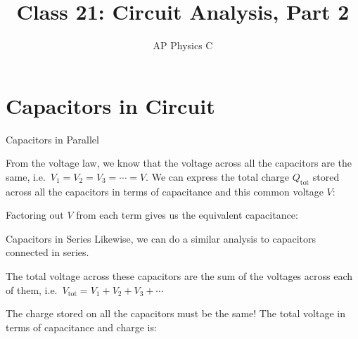 \documentclass[12pt,aspectratio=169]{beamer}
\title{Class 21: Circuit Analysis, Part 2}
\subtitle{AP Physics C}
\begin{document}
\begin{frame}
  \maketitle
\end{frame}



\section{Capacitors in Circuit}

\begin{frame}{Capacitors in Parallel}
  \begin{center}
  \end{center}
  From the voltage law, we know that the voltage across all the capacitors are
  the same, i.e.\ $V_1=V_2=V_3=\cdots=V$. We can express the total charge
  $Q_\text{tot}$ stored across all the capacitors in terms of capacitance and
  this common voltage $V$: 

  
  Factoring out $V$ from each term gives us the equivalent capacitance:

\end{frame}



\begin{frame}{Capacitors in Series}
  Likewise, we can do a similar analysis to capacitors connected in series.
  \begin{center}
  \end{center}
  The total voltage across these capacitors are the sum of the voltages across
  each of them, i.e.\ $V_\text{tot}=V_1+V_2+V_3+\cdots$
  
  \vspace{.1in}The charge stored on all the capacitors must be the same! The
  total voltage in terms of capacitance and charge is:

\end{frame}
\end{document}
